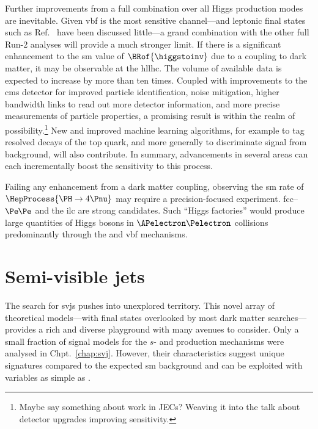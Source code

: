 Further improvements from a full combination over all Higgs production modes are inevitable. Given \acrshort{vbf} is the most sensitive channel---and leptonic final states such as Ref.~ have been discussed little---a grand combination with the other full Run-2 analyses will provide a much stronger limit. If there is a significant enhancement to the \acrshort{sm} value of $\BRof{\higgstoinv}$ due to a coupling to dark matter, it may be observable at the \acrshort{hllhc}. The volume of available data is expected to increase by more than ten times. Coupled with improvements to the \acrshort{cms} detector for improved particle identification, noise mitigation, higher bandwidth links to read out more detector information, and more precise measurements of particle properties, a promising result is within the realm of possibility.\footnote{Maybe say something about work in JECs? Weaving it into the talk about detector upgrades improving sensitivity.} New and improved machine learning algorithms, for example to tag resolved decays of the top quark, and more generally to discriminate signal from background, will also contribute. In summary, advancements in several areas can each incrementally boost the sensitivity to this process.

Failing any enhancement from a dark matter coupling, observing the \acrshort{sm} rate of $\HepProcess{\PH \to \text{4}\Pnu}$ may require a precision-focused experiment. \acrshort{fcc}--$\Pe\mkern-1mu\Pe$ and the \acrshort{ilc} are strong candidates. Such ``Higgs factories'' would produce large quantities of Higgs bosons in $\APelectron \Pelectron$ collisions predominantly through the \VH and \acrshort{vbf} mechanisms.




\section{Semi-visible jets}
\label{sec:conclusions_svj}

The search for \glspl{svj} pushes into unexplored territory. This novel array of theoretical models---with final states overlooked by most dark matter searches---provides a rich and diverse playground with many avenues to consider. Only a small fraction of signal models for the $s$- and \tchannel production mechanisms were analysed in Chpt.~\ref{chap:svj}. However, their characteristics suggest unique signatures compared to the expected \acrlong{sm} background and can be exploited with variables as simple as \mT.

